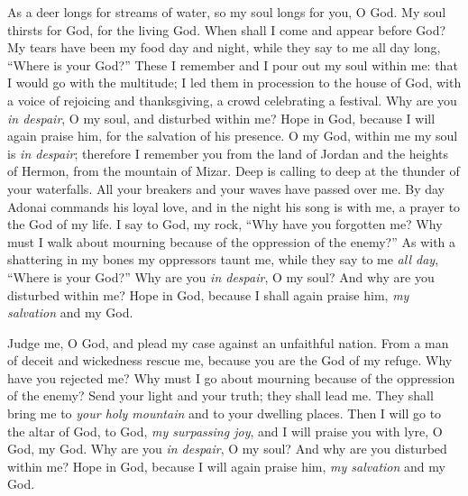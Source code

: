 \begin{biblechapter} %
 As a deer longs for streams of water, 
so my soul longs for you, O God.
\verse My soul thirsts for God, for the living God. 
When shall I come and appear before God?
\verse My tears have been my food day and night, 
while they say to me all day long, 
“Where is your God?”
\verse These I remember and I pour out my soul within me: 
that I would go with the multitude; 
I led them in procession to the house of God, 
with a voice of rejoicing and thanksgiving, 
a crowd celebrating a festival.
\verse Why are you \textit{in despair}, O my soul, 
and disturbed within me? 
Hope in God, because I will again praise him, 
for the salvation of his presence.
\verse O my God, within me my soul is \textit{in despair}; 
therefore I remember you from the land of Jordan 
and the heights of Hermon, from the mountain of Mizar.
\verse Deep is calling to deep 
at the thunder of your waterfalls. 
All your breakers and your waves 
have passed over me.
\verse By day Adonai commands his loyal love, 
and in the night his song is with me, 
a prayer to the God of my life.
\verse I say to God, my rock, 
“Why have you forgotten me? 
Why must I walk about mourning 
because of the oppression of the enemy?”
\verse As with a shattering in my bones 
my oppressors taunt me, 
while they say to me \textit{all day}, 
“Where is your God?”
\verse Why are you \textit{in despair}, O my soul? 
And why are you disturbed within me? 
Hope in God, because I shall again praise him, 
\textit{my salvation} and my God.
\end{biblechapter}

\begin{biblechapter} %
 Judge me, O God, and plead my case 
against an unfaithful nation. 
From a man of deceit and wickedness rescue me,
\verse because you are the God of my refuge. 
Why have you rejected me? 
Why must I go about mourning 
because of the oppression of the enemy?
\verse Send your light and your truth; 
they shall lead me. 
They shall bring me to \textit{your holy mountain} 
and to your dwelling places.
\verse Then I will go to the altar of God, 
to God, \textit{my surpassing joy}, 
and I will praise you with lyre, 
O God, my God.
\verse Why are you \textit{in despair}, O my soul? 
And why are you disturbed within me? 
Hope in God, because I will again praise him, 
\textit{my salvation} and my God.
\end{biblechapter}

